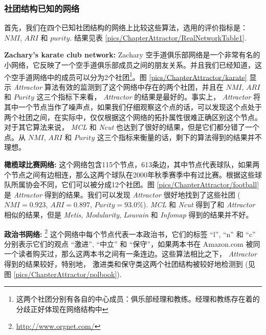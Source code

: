 \subsubsection{社团结构已知的网络}
首先，我们在四个已知社团结构的网络上比较这些算法，选用的评价指标是：$NMI$, $ARI$ 和 $purity$. 结果见表 \ref{pics/ChapterAttractor/RealNetworkTable1}. \par
{}
\vspace{2mm}
\textbf{Zachary's karate club network:}  Zachary 空手道俱乐部网络是一个非常有名的小网络，它反映了一个空手道俱乐部成员之间的朋友关系。并且我们已经知道，这个空手道网络中的成员可以分为2个社团\footnote{这两个社团分别有各自的中心成员：俱乐部经理和教练。经理和教练存在着的分歧正好体现在网络结构中}。图 \ref{pics/ChapterAttractor/karate} 显示 \emph{Attractor} 算法有效的监测到了这个网络中存在的两个社团，并且在 $NMI$, $ARI$ 和 $Purity$ 这三个指标下来看， \emph{Attractor} 的结果是最好的。事实上， \emph{Attractor} 将其中一个节点当作了噪声点，如果我们仔细观察这个点的话，可以发现这个点处于两个社团之间，在实际中，仅仅根据这个网络的拓扑属性很难正确区别这个节点。对于其它算法来说， \emph{MCL} 和 \emph{Ncut} 也达到了很好的结果，但是它们都分错了一个点。从 $NMI$, $ARI$ 和 $Purity$ 这三个指标来衡量的话，剩下的算法得到的结果并不理想。\par
{}

\vspace{2mm}
\textbf{橄榄球比赛网络:}  这个网络包含115个节点，613条边，其中节点代表球队，如果两个节点之间有边相连，那么这两个球队在2000年秋季赛季中有过比赛。根据这些球队所属协会不同，它们可以被分成12个社团。图 \ref{pics/ChapterAttractor/football} 是 \emph{Attractor} 得到的结果。我们可以发现 \emph{Attractor} 很好地找到了这些社团 ($NMI = 0.923$, $ARI = 0.897$, $Purity = 93.0\%$). \emph{MCL} 和 \emph{Ncut} 得到了和 \emph{Attractor} 相似的结果，但是 \emph{Metis}, \emph{Modularity}, \emph{Louvain} 和 \emph{Infomap} 得到的结果并不好。 \par


\vspace{2mm}
\textbf{政治书网络:} \footnote{\url{http://www.orgnet.com/}} 这个网络中每个节点代表一本政治书，它们的标签 ``l'', ``n'' 和 ``c'' 分别表示它们的观点 ``激进'', ``中立'' 和 ``保守''，如果两本书在 Amazon.com 被同一个读者购买过，那么这两本书之间有一条连边。这些算法相比之下， \emph{Attractor} 得到的结果较好，特别地， 激进类和保守类这两个社团结构被较好地检测到 (见图 \ref{pics/ChapterAttractor/polbook}).\par

